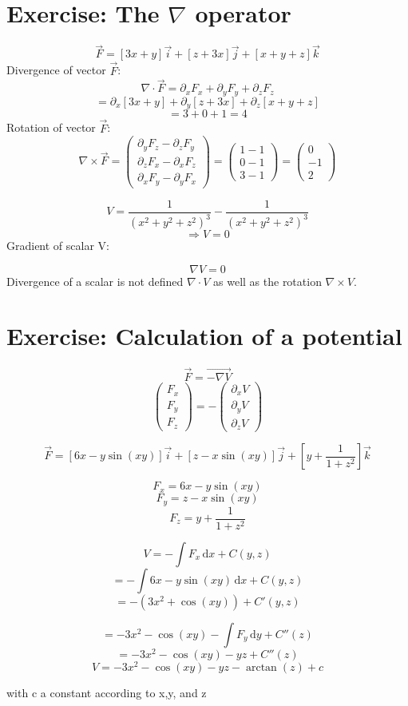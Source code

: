 \documentclass[11pt]{article}
\begin{document}
\section{Exercise: The $\nabla$ operator}

\[ \vec{F} = [3x + y]\vec{i} + [z + 3x]\vec{j} + [x + y + z]\vec{k} \]
Divergence of vector $\vec{F}$:
\[ \nabla \cdot \vec{F} = \partial_x F_x + \partial_y F_y + \partial_z F_z \]
\[ =  \partial_x [3x + y] + \partial_y  [z + 3x] + \partial_z [x + y + z] \]
\[ = 3 + 0 + 1 = 4 \]
Rotation of vector $\vec{F}$:
\[ \nabla \times \vec{F} = \begin{pmatrix}
\partial_y F_z - \partial_z F_y \\
\partial_z F_x - \partial_x F_z \\
\partial_x F_y - \partial_y F_x
\end{pmatrix}  = \begin{pmatrix}
1 - 1 \\
0 - 1 \\
3 - 1
\end{pmatrix} = \begin{pmatrix}
0 \\
-1 \\
2
\end{pmatrix}\]



\[ V = \frac{1}{(x^2 + y^2 + z^2)^3} - \frac{1}{(x^2 + y^2 + z^2)^3}\]
\[ \Rightarrow V = 0 \]
Gradient of scalar V:

\[ \nabla V = 0 \]
Divergence of a scalar is not defined $\nabla \cdot V$ as well as the rotation $\nabla \times V$.

\section{Exercise: Calculation of a potential}

\[ \vec{F} = \vec{- \nabla V} \]
\[ \begin{pmatrix}
F_x \\ F_y \\ F_z
\end{pmatrix}= - 
\begin{pmatrix}
\partial_x V \\
\partial_y V \\
\partial_z V
\end{pmatrix}\]

\[ \vec{F} = 
[6x - y \sin(xy)]\vec{i} + 
[z - x\sin(xy)]\vec{j} + 
\left[y+\frac{1}{1+z^2}\right]\vec{k} \]

\[ F_x = 6x - y \sin(xy) \]
\[ F_y = z - x\sin(xy) \]
\[ F_z = y+\frac{1}{1+z^2} \]


\[ V = - \int F_x  \, \mathrm{d}x + C(y,z) \]
\[ =  - \int 6x - y \sin(xy)  \, \mathrm{d}x + C(y,z) \]
\[ = - (3x^2 + \cos(xy)) + C'(y,z)\]

\[ = -3x^2 - \cos(xy) - \int  F_y  \, \mathrm{d}y + C''(z) \]
\[ =  -3x^2 - \cos(xy) - yz + C''(z) \]
\[ V = -3x^2 - \cos(xy) - yz - \arctan(z) + c \]

with c a constant according to x,y, and z
\end{document}
